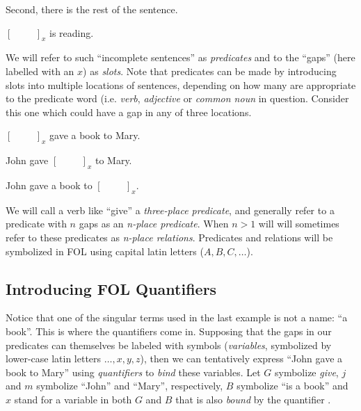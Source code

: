 Second, there is the rest of the sentence.

\begin{argument}
\item[ ] $[\hspace{1cm}]_x$ is reading.
\end{argument}

We will refer to such ``incomplete sentences'' as \emph{predicates} and to the
``gaps'' (here labelled with an $x$) as \emph{slots}. Note that predicates
can be made by introducing slots into multiple locations of sentences, depending
on how many are appropriate to the predicate word (i.e. \emph{verb},
\emph{adjective} or \emph{common noun} in question. Consider this one which
could have a gap in any of three locations.

\begin{argument}
\item[ ] $[\hspace{1cm}]_x$ gave a book to Mary.
\item[ ] John gave $[\hspace{1cm}]_x$ to Mary.
\item[ ] John gave a book to $[\hspace{1cm}]_x$.  
\end{argument}

We will call a verb like ``give'' a \emph{three-place predicate}, and
generally refer to a predicate with $n$ gaps as an \emph{n-place predicate}.
When $n>1$ will will sometimes refer to these predicates as \emph{n-place
relations}. Predicates and relations will be symbolized in FOL using capital
latin letters ($A,B,C,\dots$).

\subsection{Introducing FOL Quantifiers}

Notice that one of the singular terms used in the last example is not a name:
``a book''. This is where the quantifiers come in. Supposing that the gaps
in our predicates can themselves be labeled with symbols (\emph{variables},
symbolized by lower-case latin letters $\dots,x,y,z$), then we can tentatively
express ``John gave a book to Mary'' using \emph{quantifiers} to \emph{bind}
these variables. Let $G$ symbolize \emph{give}, $j$ and $m$ symbolize ``John''
and ``Mary'', respectively, $B$ symbolize ``is a book'' and $x$ stand for a
variable in both $G$ and $B$ that is also \emph{bound} by the quantifier
\eexists.


